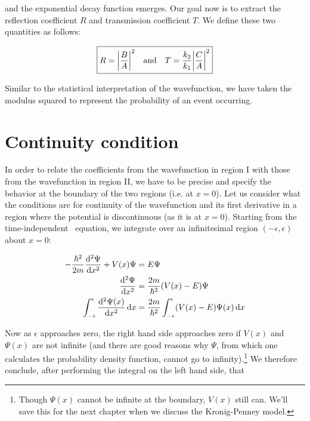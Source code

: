 \noindent and the exponential decay function emerges. 
Our goal now is to extract the reflection coefficient $R$ and transmission coefficient $T$. 
We define these two quantities as follows:

\begin{equation*}
	\boxed{R = \abs{\frac{B}{A}}^2 \quad \text{and} \quad T = \frac{k_2}{k_1}\abs{\frac{C}{A}}^2}
\end{equation*}

Similar to the statistical interpretation of the wavefunction, we have taken the modulus squared to represent the probability of an event occurring.


\section{Continuity condition}

In order to relate the coefficients from the wavefunction in region I with those from the wavefunction in region II, we have to be precise and specify the behavior at the boundary of the two regions (i.e. at $x = 0$). 
Let us consider what the conditions are for continuity of the wavefunction and its first derivative in a region where the potential is discontinuous (as it is at $x=0$). 
Starting from the time-independent \Sch\ equation, we integrate over an infinitesimal region $(-\epsilon, \epsilon)$ about $x = 0$:

\begin{align*}
	-\frac{\hbar^2}{2m} \dv[2]{\Psi}{x} + V(x)\Psi &= E\Psi \\
	\dv[2]{\Psi}{x} &= \frac{2m}{\hbar^2}(V(x) - E)\Psi \\
	\int_{-\epsilon}^{\epsilon} \dv[2]{\Psi(x)}{x} \dd{x} &= \frac{2m}{\hbar^2} \int_{-\epsilon}^{\epsilon} (V(x)-E)\Psi(x) \dd{x} 
\end{align*}

Now as $\epsilon$ approaches zero, the right hand side approaches zero if $V(x)$ and $\Psi(x)$ are not infinite (and there are good reasons why $\Psi$, from which one calculates the probability density function, cannot go to infinity).\footnote{Though $\Psi(x)$ cannot be infinite at the boundary, $V(x)$ still can. We'll save this for the next chapter when we discuss the Kronig-Penney model.} 
We therefore conclude, after performing the integral on the left hand side, that

